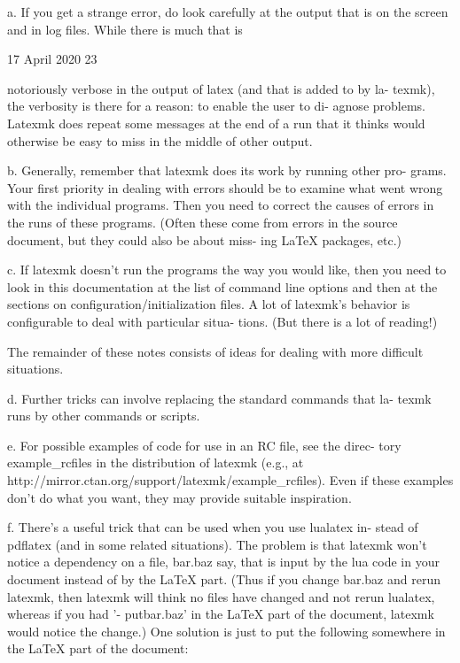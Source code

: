        a. If you get a strange error, do look carefully at the output that  is
       on  the  screen  and  in  log  files.   While  there  is  much  that is



                                 17 April 2020                              23








       notoriously verbose in the output of latex (and that is added to by la-
       texmk),  the verbosity is there for a reason: to enable the user to di-
       agnose problems.  Latexmk does repeat some messages at the end of a run
       that  it  thinks would otherwise be easy to miss in the middle of other
       output.

       b. Generally, remember that latexmk does its work by running other pro-
       grams.  Your first priority in dealing with errors should be to examine
       what went wrong with the individual programs.  Then you need to correct
       the  causes of errors in the runs of these programs.  (Often these come
       from errors in the source document, but they could also be about  miss-
       ing LaTeX packages, etc.)

       c. If latexmk doesn't run the programs the way you would like, then you
       need to look in this documentation at the list of command line  options
       and  then at the sections on configuration/initialization files.  A lot
       of latexmk's behavior is configurable to deal  with  particular  situa-
       tions.  (But there is a lot of reading!)

       The  remainder  of  these notes consists of ideas for dealing with more
       difficult situations.

       d. Further tricks can involve replacing the standard commands that  la-
       texmk runs by other commands or scripts.

       e.  For possible examples of code for use in an RC file, see the direc-
       tory  example_rcfiles  in  the  distribution  of  latexmk   (e.g.,   at
       http://mirror.ctan.org/support/latexmk/example_rcfiles).  Even if these
       examples don't do what you want, they may provide suitable inspiration.

       f. There's a useful trick that can be used when you  use  lualatex  in-
       stead  of  pdflatex  (and  in some related situations).  The problem is
       that latexmk won't notice a dependency on a file, bar.baz say, that  is
       input  by  the  lua code in your document instead of by the LaTeX part.
       (Thus if you change bar.baz and rerun latexmk, then latexmk will  think
       no  files have changed and not rerun lualatex, whereas if you had '\in-
       put{bar.baz}' in the LaTeX part of the document, latexmk  would  notice
       the  change.)   One  solution is just to put the following somewhere in
       the LaTeX part of the document:

